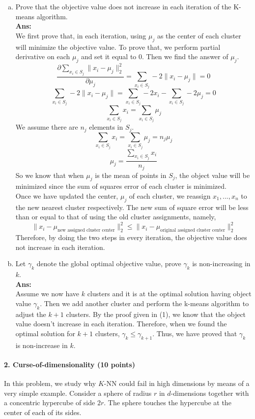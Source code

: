 \documentclass[11pt]{article}
\begin{document}
\begin{enumerate}[(a)]
\item Prove that the objective value does not increase in each iteration of the K-means algorithm.\\
\textbf{Ans:}\\
We first prove that, in each iteration, using $\mu_j$ as the center of each cluster will minimize the objective value. To prove that, we perform partial derivative on each $\mu_j$ and set it equal to 0. Then we find the answer of $\mu_j$.\\
$$\frac{\partial \sum_{x_i \in S_j}\|x_i-\mu_j\|_2^2}{\partial \mu_j} = \sum_{x_i \in S_j}-2 \|x_i-\mu_j\| =0$$
$$\sum_{x_i \in S_j}-2 \|x_i-\mu_j\| = \sum_{x_i \in S_j}-2 x_i - \sum_{x_i \in S_j}-2 \mu_j = 0$$
$$\sum_{x_i \in S_j}x_i = \sum_{x_i \in S_j}\mu_j$$
We assume there are $n_j$ elements in $S_j$.
$$\sum_{x_i \in S_j}x_i = \sum_{x_i \in S_j}\mu_j = n_j\mu_j$$
$$\mu_j = \frac{\sum_{x_i \in S_j}x_i}{n_j}$$
So we know that when $\mu_j$ is the mean of points in $S_j$, the object value will be minimized since the sum of squares error of each cluster is minimized.\\
Once we have updated the center, $\mu_j$ of each cluster, we reassign $x_1,..., x_n$ to the new nearest cluster respectively. The new sum of square error will be less than or equal to that of using the old cluster assignments, namely,
$$\|x_i - \mu_\text{new assigned cluster center}\|_2^2 \leq \|x_i-\mu_\text{original assigned cluster center}\|_2^2$$
Therefore, by doing the two steps in every iteration, the objective value does not increase in each iteration.

\item Let $\gamma_k$ denote the global optimal objective value, prove $\gamma_k$ is non-increasing in $k$.\\
\textbf{Ans:}\\
Assume we now have $k$ clusters and it is at the optimal solution having object value $\gamma_k$. Then we add another cluster and perform the k-means algorithm to adjust the $k+1$ clusters. By the proof given in (1), we know that the object value doesn't increase in each iteration. Therefore, when we found the optimal solution for $k+1$ clusters, $\gamma_k \leq \gamma_{k+1}$. Thus, we have proved that $\gamma_k$ is non-increase in $k$.

\end{enumerate}

\paragraph{2. Curse-of-dimensionality (10 points)}
In this problem, we study why $K$-NN could fail in high dimensions by means of a very simple example. Consider a sphere of radius $r$ in $d$-dimensions together with a concentric hypercube of side $2r$. The sphere touches the hypercube at the center of each of its sides.
\end{document}
